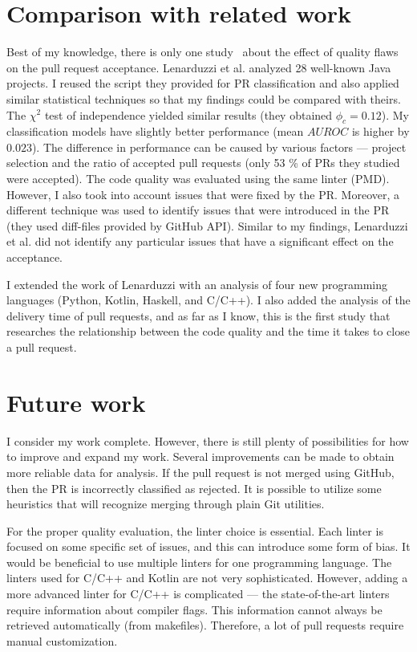 \documentclass[digital,oneside,oldtable,nolof,nolot,nocover]{fithesis4}
\begin{document}
\section{Comparison with related work}
\label{sec:org729350c}
Best of my knowledge, there is only one study~\cite{quality} about the effect of quality flaws
on the pull request acceptance. Lenarduzzi et al. analyzed 28 well-known Java projects.
I reused the script they provided for PR classification and also applied similar statistical
techniques so that my findings could be compared with theirs.
The \(\chi^2\) test of independence yielded similar results (they obtained \(\phi_c = 0.12\)).
My classification models have slightly better performance (mean \(AUROC\) is higher by \(0.023\)).
The difference in performance can be caused by various factors --- project
selection and the ratio of accepted pull requests (only 53 \% of PRs they studied were accepted).
The code quality was evaluated using the same linter (PMD). However, I also took into
account issues that were fixed by the PR. Moreover, a different technique was used to identify
issues that were introduced in the PR (they used diff-files provided by GitHub API).
Similar to my findings, Lenarduzzi et al. did not identify any particular issues that have a significant
effect on the acceptance.

I extended the work of Lenarduzzi with an analysis of four new programming
languages (Python, Kotlin, Haskell, and C/C++).  I also added the analysis
of the delivery time of pull requests, and as far as I know, this is the first
study that researches the relationship between the code quality and the time it
takes to close a pull request.
\section{Future work}
\label{sec:orgbe0bf28}
I consider my work complete. However, there is still plenty of
possibilities for how to improve and expand my work.
Several improvements can be made to obtain more reliable data for analysis.
If the pull request is not merged using GitHub, then the PR is incorrectly classified as rejected.
It is possible to utilize some heuristics that will recognize merging through plain Git utilities.

For the proper quality evaluation, the linter choice is essential. Each
linter is focused on some specific set of issues, and this can introduce
some form of bias. It would be beneficial to use multiple linters for one
programming language. The linters used for C/C++ and Kotlin are not very
sophisticated.  However, adding a more advanced linter for C/C++ is
complicated --- the state-of-the-art linters require information about
compiler flags. This information cannot always be retrieved automatically
(from makefiles).  Therefore, a lot of pull requests require manual
customization.
\end{document}
